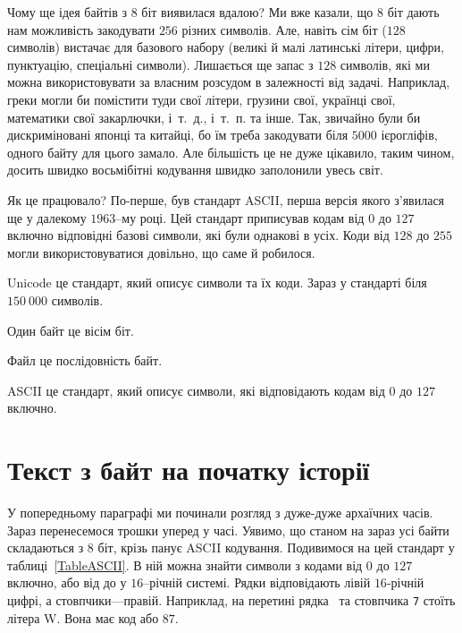 Чому ще ідея байтів з $8$ біт виявилася вдалою?
Ми вже казали, що $8$ біт дають нам можливість закодувати $256$ різних символів.
Але, навіть  сім біт ($128$ символів) вистачає для базового набору (великі й малі латинські літери, цифри, пунктуацію, спеціальні символи).
Лишається ще запас з $128$ символів, які ми можна використовувати за власним розсудом в залежності від задачі.
Наприклад, греки могли би помістити туди свої літери, грузини свої, українці свої, математики свої закарлючки, і~т.~д., і~т.~п. та інше.
Так, звичайно були би дискриміновані японці та китайці, бо їм треба закодувати біля $5000$ ієрогліфів, одного байту для цього замало.
Але більшість це не дуже цікавило, таким чином, досить швидко восьмібітні кодування швидко заполонили увесь світ.

Як це працювало?
По-перше, був стандарт ASCII, перша версія якого з'явилася ще у далекому $1963$--му році.
Цей стандарт приписував кодам від $0$ до $127$ включно відповідні базові символи, які були однакові в усіх.
Коди від $128$ до $255$ могли використовуватися довільно, що саме й робилося.

\begin{summary}
\item Unicode це стандарт, який описує символи та їх коди. Зараз у стандарті біля $150~000$ символів.
\item Один байт це вісім біт.
\item Файл це послідовність байт.
\item ASCII це стандарт, який описує символи, які відповідають кодам від $0$ до $127$ включно.
\end{summary}

\section{Текст з байт на початку історії}

У попередньому параграфі ми починали розгляд з дуже-дуже архаїчних часів.
Зараз перенесемося трошки уперед у часі.
Уявимо, що станом на зараз усі байти складаються з $8$ біт, крізь панує ASCII кодування.
Подивимося на цей стандарт у таблиці~\ref{TableASCII}.
В ній можна знайти символи з кодами від $0$ до $127$ включно, або від  до  у $16$--річній системі.
Рядки відповідають лівій $16$-річній цифрі, а стовпчики---правій.
Наприклад, на перетині рядка \ та стовпчика \texttt{7} стоїть літера \chr W.
Вона має код  або $87$.



